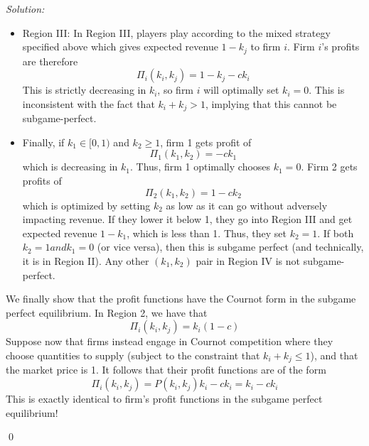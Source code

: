\documentclass[12pt]{article}
\newenvironment{sol}
    {\emph{Solution:}
    }
    {
    \qed
    }
\begin{document}
\begin{sol}
\begin{enumerate}[label=\alph*) ]
\begin{itemize}
         \item Region III: In Region III, players play according to the mixed strategy specified above which gives expected revenue $1 - k_j$ to firm $i$. Firm $i$'s profits are therefore
         \[\Pi_i(k_i, k_j) = 1 - k_j - c k_i\]
         This is strictly decreasing in $k_i$, so firm $i$ will optimally set $k_i = 0$. This is inconsistent with the fact that $k_i + k_j > 1$, implying that this cannot be subgame-perfect.
         \item Finally, if $k_1 \in [0,1)$ and $k_2 \geq 1$, firm 1 gets profit of 
         \[\Pi_1(k_1, k_2) = - c k_1\]
         which is decreasing in $k_1$. Thus, firm 1 optimally chooses $k_1 =0$.  
         Firm 2 gets profits of
         \[\Pi_2(k_1, k_2) = 1 - c k_2\]
         which is optimized by setting $k_2$ as low as it can go without adversely impacting revenue. If they lower it below 1, they go into Region III and get expected revenue $1-k_1$, which is less than 1. Thus, they set $k_2 = 1$. If both $k_2 = 1 and k_1 = 0$ (or vice versa), then this is subgame perfect (and technically, it is in Region II). Any other $(k_1, k_2)$ pair in Region IV is not subgame-perfect.
     \end{itemize}

     We finally show that the profit functions have the Cournot form in the subgame perfect equilibrium. In Region 2, we have that 
     \[\Pi_i(k_i, k_j) = k_i (1-c)\]
     Suppose now that firms instead engage in Cournot competition where they choose quantities to supply (subject to the constraint that $k_i + k_j \leq 1$), and that the market price is 1. It follows that their profit functions are of the form
     \[\Pi_i (k_i, k_j) = P(k_i, k_j)k_i - c k_i = k_i - c k_i\]
     This is exactly identical to firm's profit functions in the subgame perfect equilibrium!  
\end{enumerate}
\end{sol}
\end{document}

